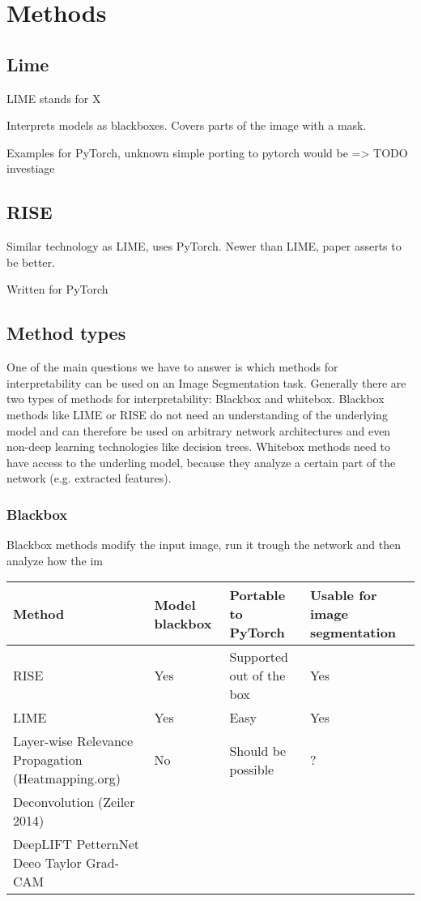 \chapter{Methods}
\section{Lime}
LIME\cite{todo} stands for X

Interprets models as blackboxes. Covers parts of the image with a mask.

Examples for PyTorch, unknown simple porting to pytorch would be => TODO investiage


\section{RISE}
Similar technology as LIME, uses PyTorch. Newer than LIME, paper asserts to be better.

Written for PyTorch





\section{Method types}
One of the main questions we have to answer is which methods for interpretability can be used on an Image Segmentation task.
Generally there are two types of methods for interpretability: Blackbox and whitebox.
Blackbox methods like LIME or RISE do not need an understanding of the underlying model and can therefore be used on arbitrary network architectures and even non-deep learning technologies like decision trees.
Whitebox methods need to have access to the underling model, because they analyze a certain part of the network (e.g. extracted features).

\subsection{Blackbox}
Blackbox methods modify the input image, run it trough the network and then analyze how the im


\begin{tabular}{|l|l|l|l|}
\hline
 \textbf{Method} & \textbf{Model blackbox} & \textbf{Portable to PyTorch} & \textbf{Usable for image segmentation} \\ \hline
 RISE & Yes & Supported out of the box & Yes\\ \hline
 LIME & Yes & Easy & Yes \\ \hline
 Layer-wise Relevance Propagation (Heatmapping.org) & No & Should be possible & ? \\ \hline
 Deconvolution (Zeiler 2014) \\ \hline
 DeepLIFT
 PetternNet
 Deeo Taylor
 Grad-CAM
 
\end{tabular}

